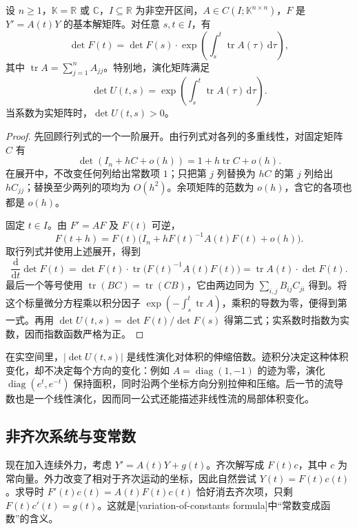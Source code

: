 \begin{proposition}[Liouville 公式]\label{b2:prop:ode-liouville}
设 \(n\geq1\)，\(\mathbb K=\mathbb R\) 或 \(\mathbb C\)，\(I\subseteq\mathbb R\) 为非空开区间，\(A\in C(I;\mathbb K^{n\times n})\)，\(F\) 是 \(Y'=A(t)Y\) 的基本解矩阵。对任意 \(s,t\in I\)，有
\[
 \det F(t)=\det F(s)\cdot
 \exp\left(\int_s^t\operatorname{tr}A(\tau)\,\mathrm d\tau\right),
\]
其中 \(\operatorname{tr}A=\sum_{j=1}^n A_{jj}\)。特别地，演化矩阵满足
\[
 \det U(t,s)=\exp\left(\int_s^t\operatorname{tr}A(\tau)\,\mathrm d\tau\right).
\]
当系数为实矩阵时，\(\det U(t,s)>0\)。
\end{proposition}
\begin{proof}
先回顾行列式的一个一阶展开。由行列式对各列的多重线性，对固定矩阵 \(C\) 有
\[
 \det(I_n+hC+o(h))=1+h\operatorname{tr}C+o(h).
\]
在展开中，不改变任何列给出常数项 \(1\)；只把第 \(j\) 列替换为 \(hC\) 的第 \(j\) 列给出 \(hC_{jj}\)；替换至少两列的项均为 \(O(h^2)\)。余项矩阵的范数为 \(o(h)\)，含它的各项也都是 \(o(h)\)。

固定 \(t\in I\)。由 \(F'=AF\) 及 \(F(t)\) 可逆，
\[
 F(t+h)=F(t)\bigl(I_n+hF(t)^{-1}A(t)F(t)+o(h)\bigr).
\]
取行列式并使用上述展开，得到
\[
 \frac{\mathrm d}{\mathrm dt}\det F(t)
 =\det F(t)\cdot\operatorname{tr}\bigl(F(t)^{-1}A(t)F(t)\bigr)
 =\operatorname{tr}A(t)\cdot\det F(t).
\]
最后一个等号使用 \(\operatorname{tr}(BC)=\operatorname{tr}(CB)\)，它由两边同为 \(\sum_{i,j}B_{ij}C_{ji}\) 得到。将这个标量微分方程乘以积分因子 \(\exp(-\int_s^t\operatorname{tr}A)\)，乘积的导数为零，便得到第一式。再用 \(\det U(t,s)=\det F(t)/\det F(s)\) 得第二式；实系数时指数为实数，因而指数函数严格为正。
\end{proof}

在实空间里，\(|\det U(t,s)|\) 是线性演化对体积的伸缩倍数。迹积分决定这种体积变化，却不决定每个方向的变化：例如 \(A=\operatorname{diag}(1,-1)\) 的迹为零，演化 \(\operatorname{diag}(e^t,e^{-t})\) 保持面积，同时沿两个坐标方向分别拉伸和压缩。后一节的流导数也是一个线性演化，因而同一公式还能描述非线性流的局部体积变化。

\subsection{非齐次系统与变常数}
\label{b2:subsec:ode-variation-constants}

现在加入连续外力，考虑 \(Y'=A(t)Y+g(t)\)。齐次解写成 \(F(t)c\)，其中 \(c\) 为常向量。外力改变了相对于齐次运动的坐标，因此自然尝试 \(Y(t)=F(t)c(t)\)。求导时 \(F'(t)c(t)=A(t)F(t)c(t)\) 恰好消去齐次项，只剩 \(F(t)c'(t)=g(t)\)。这就是[variation-of-constants formula]中“常数变成函数”的含义。

